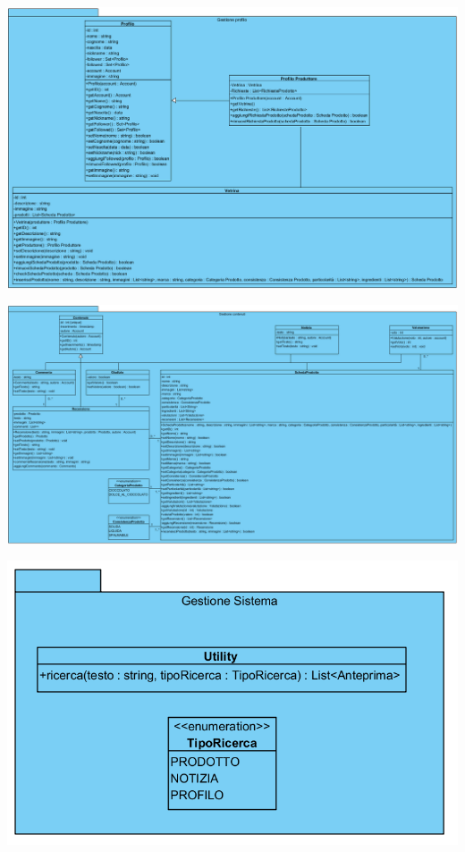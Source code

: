 \begin{landscape}
\begin{center}
			\includegraphics[width=\linewidth]{assets/visualParadigm/classi/GestioneProfilo}
\end{center}
\end{landscape}

\begin{landscape}
\begin{center}
			\includegraphics[width=1.1\linewidth]{assets/visualParadigm/classi/GestioneContenuti}
\end{center}
\end{landscape}

\begin{center}
			\includegraphics[width=\textwidth]{assets/visualParadigm/classi/GestioneSistema}
\end{center}



